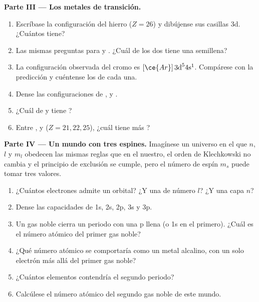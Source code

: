 \begin{problem}
\medskip
\noindent\textbf{Parte III --- Los metales de transición.}
\begin{enumerate}[resume]
  \item Escríbase la configuración del hierro ($Z = 26$) y dibújense sus
        casillas 3d. ¿Cuántos  tiene?
  \item Las mismas preguntas para  y . ¿Cuál de
        los dos tiene una  semillena?
  \item La configuración observada del cromo es $[\ce{Ar}]\,3\text{d}^5
        4\text{s}^1$. Compárese con la predicción y cuéntense los
         de cada una.
  \item Dense las configuraciones de ,  y .
  \item ¿Cuál de  y  tiene ?
  \item Entre ,  y  ($Z = 21, 22, 25$),
        ¿cuál tiene más ?
\end{enumerate}

\medskip
\noindent\textbf{Parte IV --- Un mundo con tres espines.}
Imagínese un universo en el que $n$, $l$ y $m_l$ obedecen las mismas
reglas que en el nuestro, el orden de Klechkowski no cambia y el
principio de exclusión se cumple, pero el número de espín $m_s$ puede
tomar tres valores.
\begin{enumerate}[resume]
  \item ¿Cuántos electrones admite un orbital? ¿Y una  de número
        $l$? ¿Y una capa $n$?
  \item Dense las capacidades de 1s, 2s, 2p, 3s y 3p.
  \item Un gas noble cierra un periodo con una  p llena (o 1s en
        el primero). ¿Cuál es el número atómico del primer gas noble?
  \item ¿Qué número atómico se comportaría como un metal alcalino, con un
        solo electrón más allá del primer gas noble?
  \item ¿Cuántos elementos contendría el segundo periodo?
  \item Calcúlese el número atómico del segundo gas noble de este mundo.
\end{enumerate}
\end{problem}

